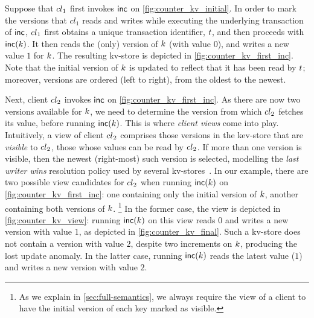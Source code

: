 Suppose that ${cl}_1$ first invokes $\mathsf{inc}$ on \cref{fig:counter_kv_initial}. 
In order to mark the versions that $cl_1$ reads and writes while executing the underlying transaction of $\mathsf{inc}$,  
${cl}_1$ first obtains a unique transaction identifier, $\txid$, 
and then proceeds with $\mathsf{inc}(k)$. 
It then reads the (only) version of $k$ (with value $0$), 
and writes a new value $1$ for $k$. 
The resulting kv-store is depicted in \cref{fig:counter_kv_first_inc}.
Note that the initial version of $k$ is updated to reflect that it has been read by $\txid$; 
moreover, versions are ordered (left to right), from the oldest to the newest.

Next, client ${cl}_2$ invokes $\mathsf{inc}$ on \cref{fig:counter_kv_first_inc}. 
As there are now two versions available for $k$, 
we need to determine the version from which ${cl}_2$ fetches its value, before running $\mathsf{inc}(k)$.
This is where \emph{client views} come into play.
Intuitively, a view of client ${cl}_2$ comprises those versions in the kev-store that are \emph{visible} to ${cl}_2$, 
\ie those whose values can be read by ${cl}_2$. 
If more than one version is visible, then the newest (right-most) such version is selected, 
modelling the \emph{last writer wins} resolution policy used by several kv-stores~\cite{vogels:2009:ec:1435417.1435432}. 
In our example, there are two possible view candidates for ${cl}_2$ when running $\mathsf{inc}(k)$ on \cref{fig:counter_kv_first_inc}: 
one containing only the initial version of $k$, 
another containing both versions of $k$.%
\footnote{
As we explain in \cref{sec:full-semantics}, we always require the view of a client 
to have the initial version of each key marked as visible.}
In the former case, the view is depicted in \cref{fig:counter_kv_view}:
running $\mathsf{inc}(k)$ on this view reads $0$ and writes a new version with value $1$, as depicted in \cref{fig:counter_kv_final}.
Such a kv-store does not contain a version with value $2$, despite two increments on $k$, producing the lost update anomaly.
In the latter case, running $\mathsf{inc}(k)$ reads the latest value ($1$) and writes a new version with value $2$.

